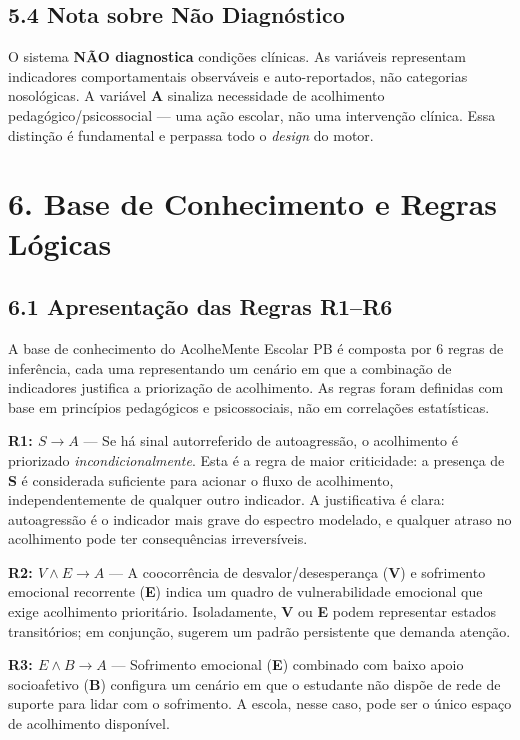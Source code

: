\documentclass[11pt]{article}
\begin{document}
\subsection{5.4 Nota sobre Não
Diagnóstico}\label{nota-sobre-nuxe3o-diagnuxf3stico}

O sistema \textbf{NÃO diagnostica} condições clínicas. As variáveis
representam indicadores comportamentais observáveis e auto-reportados,
não categorias nosológicas. A variável \textbf{A} sinaliza necessidade
de acolhimento pedagógico/psicossocial --- uma ação escolar, não uma
intervenção clínica. Essa distinção é fundamental e perpassa todo o
\emph{design} do motor.

    \section{6. Base de Conhecimento e Regras
Lógicas}\label{base-de-conhecimento-e-regras-luxf3gicas}

\subsection{6.1 Apresentação das Regras
R1--R6}\label{apresentauxe7uxe3o-das-regras-r1r6}

A base de conhecimento do AcolheMente Escolar PB é composta por 6 regras
de inferência, cada uma representando um cenário em que a combinação de
indicadores justifica a priorização de acolhimento. As regras foram
definidas com base em princípios pedagógicos e psicossociais, não em
correlações estatísticas.

\textbf{R1: \(S \rightarrow A\)} --- Se há sinal autorreferido de
autoagressão, o acolhimento é priorizado \emph{incondicionalmente}. Esta
é a regra de maior criticidade: a presença de \textbf{S} é considerada
suficiente para acionar o fluxo de acolhimento, independentemente de
qualquer outro indicador. A justificativa é clara: autoagressão é o
indicador mais grave do espectro modelado, e qualquer atraso no
acolhimento pode ter consequências irreversíveis.

\textbf{R2: \(V \land E \rightarrow A\)} --- A coocorrência de
desvalor/desesperança (\textbf{V}) e sofrimento emocional recorrente
(\textbf{E}) indica um quadro de vulnerabilidade emocional que exige
acolhimento prioritário. Isoladamente, \textbf{V} ou \textbf{E} podem
representar estados transitórios; em conjunção, sugerem um padrão
persistente que demanda atenção.

\textbf{R3: \(E \land B \rightarrow A\)} --- Sofrimento emocional
(\textbf{E}) combinado com baixo apoio socioafetivo (\textbf{B})
configura um cenário em que o estudante não dispõe de rede de suporte
para lidar com o sofrimento. A escola, nesse caso, pode ser o único
espaço de acolhimento disponível.
\end{document}
